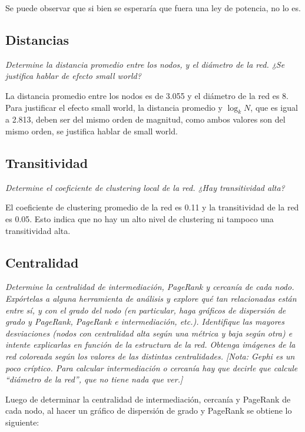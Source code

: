 \documentclass[12pt]{article}
\begin{document}
Se puede observar que si bien se esperaría que fuera una ley de potencia, no lo es.
\subsection{Distancias} 
\textit{Determine la distancia promedio entre los nodos, y el diámetro de la red. ¿Se justifica hablar de efecto small world?}

La distancia promedio entre los nodos es de 3.055 y el diámetro de la red es 8. Para justificar el efecto small world, la distancia promedio y $\log_{k} N$, que es igual a 2.813, deben ser del mismo orden de magnitud, como ambos valores son del mismo orden, se justifica hablar de small world.


\subsection{Transitividad} 
\textit{Determine el coeficiente de clustering local de la red. ¿Hay transitividad alta?}

El coeficiente de clustering promedio de la red es 0.11 y la transitividad de la red es 0.05. Esto indica que no hay un alto nivel de clustering ni tampoco una transitividad alta.


\subsection{Centralidad}  
\textit{Determine la centralidad de intermediación, PageRank y cercanía de cada nodo. Expórtelas a alguna herramienta de análisis y explore qué tan relacionadas están entre sí, y con el grado del nodo (en particular, haga gráficos de dispersión de grado y PageRank, PageRank e intermediación, etc.). Identifique las mayores desviaciones (nodos con centralidad alta según una métrica y baja según otra) e intente explicarlas en función de la estructura de la red. Obtenga imágenes de la red coloreada según los valores de las distintas centralidades. [Nota: Gephi es un poco críptico. Para calcular intermediación o cercanía hay que decirle que calcule ``diámetro de la red'', que no tiene nada que ver.]}

Luego de determinar la centralidad de intermediación, cercanía y PageRank de cada nodo, al hacer un gráfico de dispersión de grado y PageRank se obtiene lo siguiente:
\end{document}
